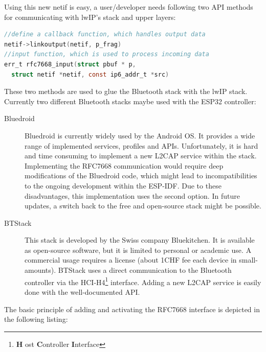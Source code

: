 \documentclass[]{scrreprt}%
\begin{document}
Using this new netif is easy, a user/developer needs following two API methods for communicating with lwIP's stack and upper layers:

\begin{lstlisting}[frame=single,language=C,basicstyle=\footnotesize] 
//define a callback function, which handles output data
netif->linkoutput(netif, p_frag)
//input function, which is used to process incoming data
err_t rfc7668_input(struct pbuf * p, 
  struct netif *netif, const ip6_addr_t *src)
\end{lstlisting}

These two methods are used to glue the Bluetooth stack with the lwIP stack.
Currently two different Bluetooth stacks maybe used with the ESP32 controller:
\begin{description}
 \item[Bluedroid] Bluedroid is currently widely used by the Android OS. It provides a wide range of implemented services, profiles and APIs.
 Unfortunately, it is hard and time consuming to implement a new L2CAP service within the stack. Implementing the RFC7668 communication would require deep
 modifications of the Bluedroid code, which might lead to incompatibilities to the ongoing development within the ESP-IDF. Due to these disadvantages, this implementation
 uses the second option. In future updates, a switch back to the free and open-source stack might be possible.
 \item[BTStack] This stack is developed by the Swiss company Bluekitchen. It is available as open-source software, but it is limited to personal or academic use. A commercial
 usage requires a license (about 1CHF fee each device in small-amounts). BTStack uses a direct communication to the Bluetooth controller via the HCI-H4\footnote{\textbf{H} ost \textbf{C}ontroller \textbf{I}nterface} interface. Adding a new L2CAP service is easily done with the well-documented API.
\end{description}


The basic principle of adding and activating the RFC7668 interface is depicted in the following listing:
\end{document}
